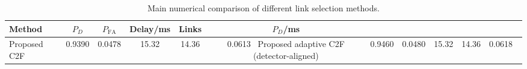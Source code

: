 \begin{table}[t]
    \centering
    \caption{Main numerical comparison of different link selection methods.}
    \label{tab:main_summary}
    \begin{tabular}{l c c c c c}
        \hline
        Method & $P_D$ & $P_{\mathrm{FA}}$ & Delay/ms & Links & $P_D$/ms \\
        \hline
        Proposed C2F & 0.9390 & 0.0478 & 15.32 & 14.36 & 0.0613 \
        Proposed adaptive C2F (detector-aligned) & 0.9460 & 0.0480 & 15.32 & 14.36 & 0.0618 \
        \hline
    \end{tabular}
\end{table}
